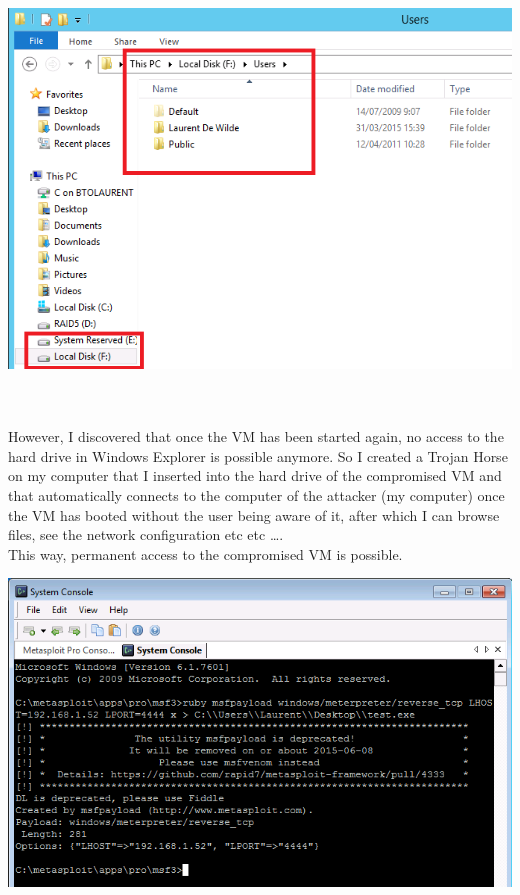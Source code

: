 \documentclass[11pt, a4paper]{article}
\begin{document}
$\;$ \\ \\
\noindent\begin{minipage}{\textwidth}
    \centering
    \includegraphics[width=\textwidth]{Mount_2.png}
\end{minipage}
$\;$ \\ \\
However, I discovered that once the VM has been started again, no access to the hard drive in Windows Explorer is possible anymore. So I created a Trojan Horse on my computer that I inserted into the hard drive of the compromised VM and that automatically connects to the computer of the attacker (my computer) once the VM has booted without the user being aware of it, after which I can browse files, see the network configuration etc etc \ldots .\\
This way, permanent access to the compromised VM is possible. \\
\noindent\begin{minipage}{\textwidth}
    \centering
    \includegraphics[width=\textwidth]{Payload_1.png}
\end{minipage}
\end{document}
